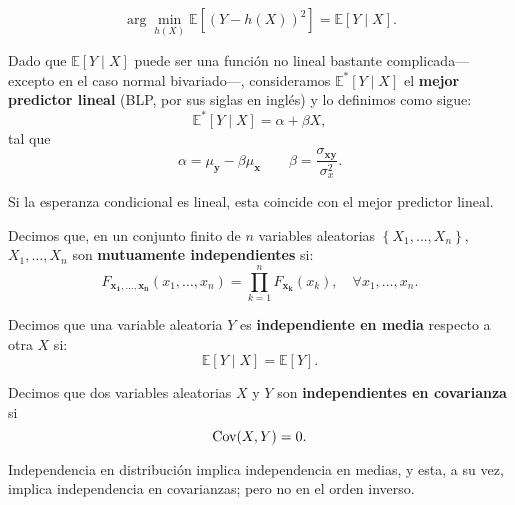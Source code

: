 \documentclass[8pt,a4paper]{extarticle}
\begin{document}
\begin{multicols}{3}
\begin{boxprop}[]
	\[
		\arg\min_{h(X)} \mathbb{E}\left[ \left( Y - h(X) \right)^2  \right] = \mathbb{E}\left[ Y  \mid X \right] 
	.\] 
\end{boxprop}

\begin{boxdef}
	Dado que $\mathbb{E}[Y  \mid X]$ puede ser una función no lineal bastante complicada---excepto en el caso normal bivariado---, consideramos $\mathbb{E}^* [Y  \mid X]$ el \textbf{mejor predictor lineal} (BLP, por sus siglas en inglés) y lo definimos como sigue:
	\[
		\mathbb{E}^*\left[ Y  \mid X \right] = \alpha + \beta X
	,\] 
	tal que
	\[
		\alpha = \mu_{\mathbf{y}} - \beta \mu_{\mathbf{x}} \qquad \beta = \frac{\sigma_{\mathbf{xy}}}{\sigma^2_{x}}
	.\] 
\end{boxdef}

\begin{boxtheo}[]
	Si la esperanza condicional es lineal, esta coincide con el mejor predictor lineal.
\end{boxtheo}

\sectionbreak

\begin{boxdef}
	Decimos que, en un conjunto finito de $n$ variables aleatorias $\left\{ X_1, \ldots, X_n \right\}$, $X_1, \ldots, X_n$ son \textbf{mutuamente independientes} si:
	\[
		F_{\mathbf{x_1,\ldots,x_n}} (x_1, \ldots, x_n) = \prod_{k=1}^{n} F_{\mathbf{x_k}} (x_k), \quad \forall x_1, \ldots, x_n
	.\] 
\end{boxdef}

\begin{boxdef}
	Decimos que una variable aleatoria $Y$ es \textbf{independiente en media} respecto a otra $X$ si:
	\[
		\mathbb{E}[Y  \mid X] = \mathbb{E}[Y]
	.\] 
\end{boxdef}

\begin{boxdef}
	Decimos que dos variables aleatorias $X$ y $Y$ son \textbf{independientes en covarianza} si
	\[
		\text{\normalfont Cov}(X,Y) = 0
	.\] 
\end{boxdef}

\begin{boxtheo}[]
	Independencia en distribución implica independencia en medias, y esta, a su vez, implica independencia en covarianzas; pero no en el orden inverso.
\end{boxtheo}


\end{multicols}
\end{document}
